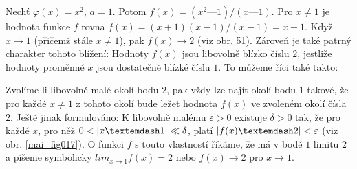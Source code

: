 \wikitextrule
\begin{example}\label{MAI:exam028}
  Nechť \(\varphi(x) = x^2\), \(a = 1\). Potom \(f(x) = (x^2 — 1 )/(x — 1)\). Pro \(x \neq 1\) je 
  hodnota funkce \(f\) rovna \(f(x) = (x + 1) (x - 1 )/(x - 1) = x + 1\). Když \(x \rightarrow 1\) 
  (přičemž stále \(x \neq 1\)), pak \(f(x) \rightarrow 2\) (viz obr. 51). Zároveň je také patrný 
  charakter tohoto blížení: Hodnoty \(f(x)\) jsou libovolně blízko číslu \(2\), jestliže hodnoty 
  proměnné \(x\) jsou dostatečně blízké číslu \(1\). To můžeme říci také takto: 
  
  {\centering
   \captionsetup{type=figure}
   
  \par}
  
  Zvolíme-li libovolně malé okolí bodu \(2\), pak vždy lze najít okolí bodu \(1\) takové, že pro 
  každé \(x \neq 1\) z tohoto okolí bude ležet hodnota \(f(x)\) ve zvoleném okolí čísla \(2\). 
  Ještě jinak formulováno: K libovolně malému \(\varepsilon > 0\) existuje \(\delta > 0\) tak, 
  že pro každé \(x\), pro něž \(0 < \abs{x — 1} \ll \delta\), platí \(\abs{f(x) — 2} < 
  \varepsilon\) (viz obr. \ref{mai_fig017}). O funkci \(f\) s touto vlastností říkáme, že má v bodě 
  \(1\) limitu \(2\) a píšeme symbolicky \(lim_{x \to 1}f(x) = 2\) nebo \(f(x) \rightarrow 2\) pro 
  \(x \rightarrow 1\).
\end{example}















